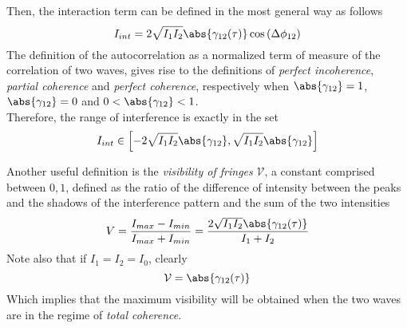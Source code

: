 \documentclass[../electromagnetism.tex]{subfiles}
\begin{document}
Then, the interaction term can be defined in the most general way as follows
\begin{equation}
	I_{int}=2\sqrt{I_1I_2}\abs{\gamma_{12}(\tau)}\cos\left( \Delta\phi_{12} \right)	
	\label{eq:intterm-autocorr.pcorr}
\end{equation}
The definition of the autocorrelation as a normalized term of measure of the correlation of two waves, gives rise to the definitions of \textit{perfect incoherence}, \textit{partial coherence} and \textit{perfect coherence}, respectively when $\abs{\gamma_{12}}=1$, $\abs{\gamma_{12}}=0$ and $0<\abs{\gamma_{12}}<1$.\\
Therefore, the range of interference is exactly in the set
\begin{equation}
	I_{int}\in\left[ -2\sqrt{I_1I_2}\abs{\gamma_{12}},\sqrt{I_1I_2}\abs{\gamma_{12}} \right]
	\label{eq:interfrange.pcorr}
\end{equation}
\begin{dfn}[Visibility]
	Another useful definition is the \textit{visibility of fringes} $\mathcal{V}$, a constant comprised between $0,1$, defined as the ratio of the difference of intensity between the peaks and the shadows of the interference pattern and the sum of the two intensities
	\begin{equation}
		V=\frac{I_{max}-I_{min}}{I_{max}+I_{min}}=\frac{2\sqrt{I_1I_2}\abs{\gamma_{12}(\tau)}}{I_1+I_2}
		\label{eq:visibility.pcorr}
	\end{equation}
	Note also that if $I_1=I_2=I_0$, clearly
	\begin{equation*}
		\mathcal{V}=\abs{\gamma_{12}(\tau)}
	\end{equation*}
	Which implies that the maximum visibility will be obtained when the two waves are in the regime of \textit{total coherence}.
\end{dfn}
\end{document}
